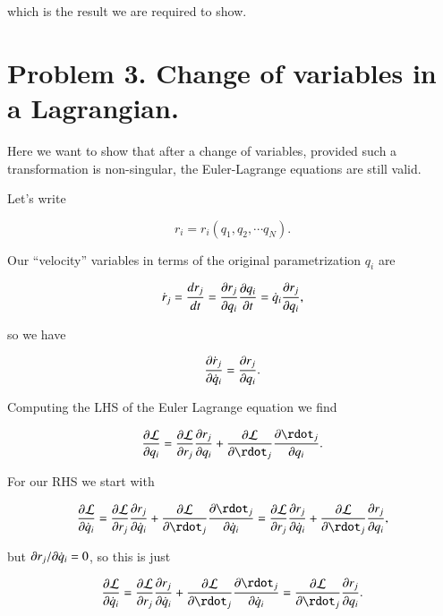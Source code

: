 which is the result we are required to show.

\section{Problem 3.  Change of variables in a Lagrangian.}

Here we want to show that after a change of variables, provided such a transformation is non-singular, the Euler-Lagrange equations are still valid.

Let's write

\begin{equation}\label{eqn:classicalMechanicsPs1:320}
r_i = r_i(q_1, q_2, \cdots q_N).
\end{equation}

Our ``velocity'' variables in terms of the original parametrization $q_i$ are

\begin{equation}\label{eqn:classicalMechanicsPs1:340}
\dot{r}_j = \frac{dr_j}{dt} = \PD{q_i}{r_j} \PD{t}{q_i} = \qdot_i \PD{q_i}{r_j},
\end{equation}

so we have

\begin{equation}\label{eqn:classicalMechanicsPs1:360}
\PD{\qdot_i}{\dot{r}_j} = \PD{q_i}{r_j}.
\end{equation}

Computing the LHS of the Euler Lagrange equation we find

\begin{equation}\label{eqn:classicalMechanicsPs1:380}
\PD{q_i}{\LL} = 
\PD{r_j}{\LL} \PD{q_i}{r_j}
+\PD{\rdot_j}{\LL} \PD{q_i}{\rdot_j}.
\end{equation}

For our RHS we start with

\begin{equation}\label{eqn:classicalMechanicsPs1:400}
\PD{\qdot_i}{\LL} 
= 
\PD{r_j}{\LL} \PD{\qdot_i}{r_j}
+\PD{\rdot_j}{\LL} \PD{\qdot_i}{\rdot_j}
= 
\PD{r_j}{\LL} \PD{\qdot_i}{r_j}
+\PD{\rdot_j}{\LL} \PD{q_i}{r_j},
\end{equation}

but $\PDi{\qdot_i}{r_j} = 0$, so this is just

\begin{equation}\label{eqn:classicalMechanicsPs1:420}
\PD{\qdot_i}{\LL} 
= 
\PD{r_j}{\LL} \PD{\qdot_i}{r_j}
+\PD{\rdot_j}{\LL} \PD{\qdot_i}{\rdot_j}
= 
\PD{\rdot_j}{\LL} \PD{q_i}{r_j}.
\end{equation}

